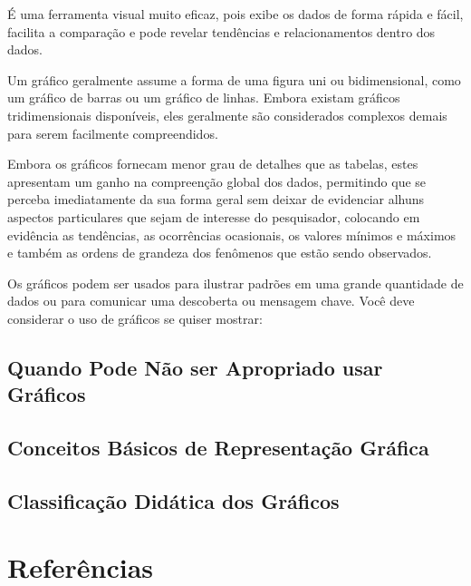 \documentclass[
  letterpaper,
  DIV=11,
  numbers=noendperiod]{scrreprt}
\begin{document}
É uma ferramenta visual muito eficaz, pois exibe os dados de forma
rápida e fácil, facilita a comparação e pode revelar tendências e
relacionamentos dentro dos dados.

Um gráfico geralmente assume a forma de uma figura uni ou bidimensional,
como um gráfico de barras ou um gráfico de linhas. Embora existam
gráficos tridimensionais disponíveis, eles geralmente são considerados
complexos demais para serem facilmente compreendidos.

Embora os gráficos fornecam menor grau de detalhes que as tabelas, estes
apresentam um ganho na compreenção global dos dados, permitindo que se
perceba imediatamente da sua forma geral sem deixar de evidenciar alhuns
aspectos particulares que sejam de interesse do pesquisador, colocando
em evidência as tendências, as ocorrências ocasionais, os valores
mínimos e máximos e também as ordens de grandeza dos fenômenos que estão
sendo observados.

Os gráficos podem ser usados para ilustrar padrões em uma grande
quantidade de dados ou para comunicar uma descoberta ou mensagem chave.
Você deve considerar o uso de gráficos se quiser mostrar:

\hypertarget{quando-pode-nuxe3o-ser-apropriado-usar-gruxe1ficos}{%
\section{Quando Pode Não ser Apropriado usar
Gráficos}\label{quando-pode-nuxe3o-ser-apropriado-usar-gruxe1ficos}}

\hypertarget{conceitos-buxe1sicos-de-representauxe7uxe3o-gruxe1fica}{%
\section{Conceitos Básicos de Representação
Gráfica}\label{conceitos-buxe1sicos-de-representauxe7uxe3o-gruxe1fica}}

\hypertarget{classificauxe7uxe3o-diduxe1tica-dos-gruxe1ficos}{%
\section{Classificação Didática dos
Gráficos}\label{classificauxe7uxe3o-diduxe1tica-dos-gruxe1ficos}}


\hypertarget{referuxeancias}{%
\chapter*{Referências}\label{referuxeancias}}

\end{document}
